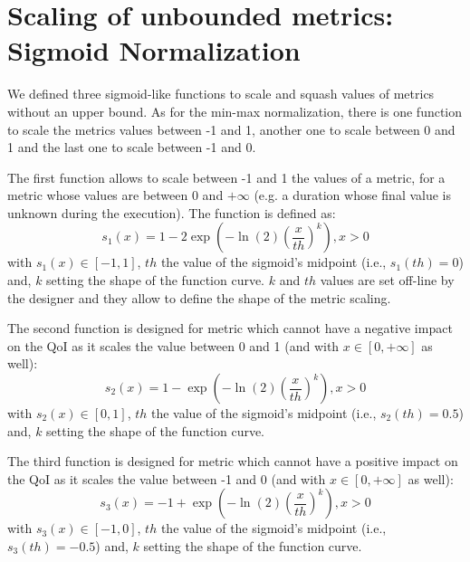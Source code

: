 \section{Scaling of unbounded metrics: Sigmoid Normalization}\label{subsubsec:loga}
We defined three sigmoid-like functions to scale and squash values of metrics without an upper bound. As for the min-max normalization, there is one function to scale the metrics values between -1 and 1, another one to scale between 0 and 1 and the last one to scale between -1 and 0. 

The first function allows to scale between -1 and 1 the values of a metric, for a metric whose values are between 0 and $+\infty$ (e.g. a duration whose final value is unknown during the execution). The function is defined as:
\begin{equation}\label{eq:sig1}
s_1(x) = 1 - 2 \exp{\left(-\ln{(2)}\left(\dfrac{x}{th}\right)^k\right)}, x > 0
\end{equation}
with $s_1(x) \in [-1,1]$, $th$ the value of the sigmoid's midpoint (i.e., $s_1(th)=0$) and, $k$ setting the shape of the function curve. $k$ and $th$ values are set off-line by the designer and they allow to define the shape of the metric scaling.

The second function is designed for metric which cannot have a negative impact on the QoI as it scales the value between 0 and 1 (and with $x \in [0,+\infty]$ as well):
\begin{equation}\label{eq:sig2}
s_2(x) = 1 - \exp{\left(-\ln{(2)}\left(\dfrac{x}{th}\right)^k\right)}, x > 0
\end{equation}
with $s_2(x) \in [0,1]$, $th$ the value of the sigmoid's midpoint (i.e., $s_2(th)=0.5$) and, $k$ setting the shape of the function curve.

The third function is designed for metric which cannot have a positive impact on the QoI as it scales the value between -1 and 0 (and with $x \in [0,+\infty]$ as well):
\begin{equation}\label{eq:sig3}
s_3(x) = - 1 + \exp{\left(-\ln{(2)}\left(\dfrac{x}{th}\right)^k\right)}, x > 0
\end{equation}
with $s_3(x) \in [-1,0]$, $th$ the value of the sigmoid's midpoint (i.e., $s_3(th)=-0.5$) and, $k$ setting the shape of the function curve.

